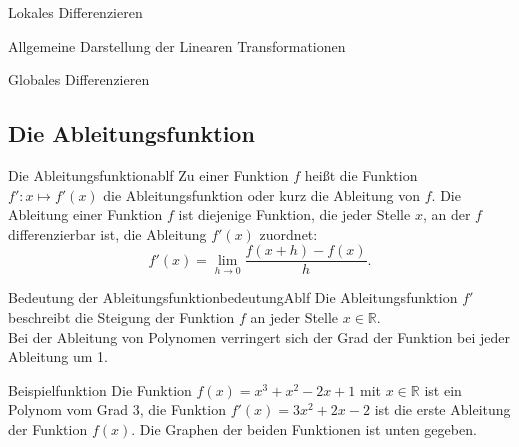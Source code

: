 \begin{section}{Lokales Differenzieren}
\begin{merke}{Allgemeine Darstellung der Linearen Transformationen}
\begin{itemize}
\end{itemize}
\end{merke}
\label{lintrans}
\end{section}

\begin{section}{Globales Differenzieren}
\subsection{Die Ableitungsfunktion}
\begin{defi}{Die Ableitungsfunktion}{ablf}
    Zu einer Funktion $f$ heißt die Funktion $f': x \mapsto f'(x)$ die Ableitungsfunktion oder kurz die Ableitung von $f$. Die Ableitung einer Funktion $f$ ist diejenige Funktion, die jeder Stelle $x$, an der $f$ differenzierbar ist, die Ableitung $f'(x)$ zuordnet:
$$f'(x)=\lim_{h\rightarrow 0} \dfrac{f(x + h) - f(x)}{h}.$$ 
\end{defi}
\begin{bem}{Bedeutung der Ableitungsfunktion}{bedeutungAblf}
   Die Ableitungsfunktion $f'$ beschreibt die Steigung der Funktion $f$ an jeder Stelle $x\in \mathds{R}$. \\
   Bei der Ableitung von Polynomen verringert sich der Grad der Funktion bei jeder Ableitung um 1.\\
\end{bem}
\begin{bsp}{Beispielfunktion}{}
Die Funktion $f(x) = x^3 + x^2 -2x+1$ mit $x\in\mathds{R}$ ist ein Polynom vom Grad 3, die Funktion $f'(x) = 3x^2+2x-2$ ist die erste Ableitung der Funktion $f(x)$. Die Graphen der beiden Funktionen ist unten gegeben. 
\begin{center}
\end{center}
\end{bsp}

\end{section}
